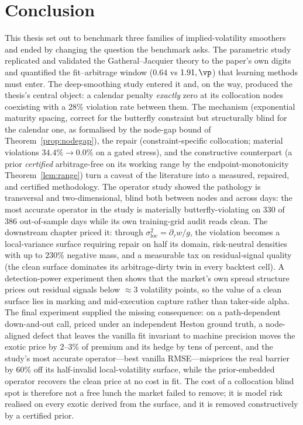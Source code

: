 \chapter{Conclusion}\label{ch:conclusion}

This thesis set out to benchmark three families of implied-volatility smoothers and ended by
changing the question the benchmark asks. The parametric study replicated and validated the
Gatheral--Jacquier theory to the paper's own digits and quantified the fit--arbitrage window
($0.64$ vs $1.91,\vp$) that learning methods must enter. The deep-smoothing study entered it
and, on the way, produced the thesis's central object: a calendar penalty \emph{exactly}
zero at its collocation nodes coexisting with a $28\%$ violation rate between them. The
mechanism (exponential maturity spacing, correct for the butterfly constraint but structurally
blind for the calendar one, as formalised by the node-gap bound of
Theorem~\ref{prop:nodegap}), the repair (constraint-specific collocation; material
violations $34.4\%\to0.0\%$ on a gated stress), and the constructive counterpart (a prior
\emph{certified} arbitrage-free on its working range by the endpoint-monotonicity
Theorem~\ref{lem:range}) turn a caveat of the literature into a measured, repaired, and
certified methodology. The operator study showed the pathology is transversal and
two-dimensional, blind both between nodes and across days: the most accurate operator in the
study is materially butterfly-violating on $330$ of $386$ out-of-sample days while its own
training-grid audit reads clean. The downstream chapter priced it: through
$\sigma_{\mathrm{loc}}^2=\partial_\tau w/g$, the violation becomes a local-variance surface
requiring repair on half its domain, risk-neutral densities with up to $230\%$ negative mass,
and a measurable tax on residual-signal quality (the clean surface dominates its
arbitrage-dirty twin in every backtest cell). A detection-power experiment then shows that the
market's own spread structure prices out residual signals below $\approx3$ volatility
points, so the value of a clean surface lies in marking and mid-execution capture rather than
taker-side alpha. The final experiment supplied the missing consequence: on a path-dependent
down-and-out call, priced under an independent Heston ground truth, a node-aligned defect that
leaves the vanilla fit invariant to machine precision moves the exotic price by
$2$--$3\%$ of premium and its hedge by tens of percent, and the study's most accurate
operator---best vanilla RMSE---misprices the real barrier by $60\%$ off its half-invalid
local-volatility surface, while the prior-embedded operator recovers the clean price at no cost
in fit. The cost of a collocation blind spot is therefore not a free lunch the market failed to
remove; it is model risk realised on every exotic derived from the surface, and it is removed
constructively by a certified prior.


